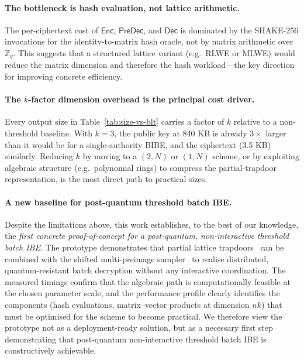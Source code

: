 \paragraph{The bottleneck is hash evaluation, not lattice arithmetic.}
The per-ciphertext cost of $\mathsf{Enc}$, $\mathsf{PreDec}$, and $\mathsf{Dec}$ is
dominated by the SHAKE-256 invocations for the identity-to-matrix hash oracle, not by
matrix arithmetic over $\mathbb{Z}_q$.
This suggests that a structured lattice variant (e.g.\ RLWE or MLWE) would reduce the
matrix dimension and therefore the hash workload—the key direction for improving concrete
efficiency.

\paragraph{The $k$-factor dimension overhead is the principal cost driver.}
Every output size in Table~\ref{tab:size-vs-blt} carries a factor of $k$ relative to a
non-threshold baseline.
With $k=3$, the public key at 840 KB is already $3\times$ larger than it would be for a
single-authority BIBE, and the ciphertext (3.5 KB) similarly.
Reducing $k$ by moving to a $(2,N)$ or $(1,N)$ scheme, or by exploiting algebraic
structure (e.g.\ polynomial rings) to compress the partial-trapdoor representation, is the
most direct path to practical sizes.

\paragraph{A new baseline for post-quantum threshold batch IBE.}
Despite the limitations above, this work establishes, to the best of our knowledge, the
\emph{first concrete proof-of-concept for a post-quantum, non-interactive threshold batch
IBE}.
The prototype demonstrates that partial lattice trapdoors~\cite{AC:ALLW25} can be combined
with the shifted multi-preimage sampler~\cite{EPRINT:BonLauTas25} to realise distributed,
quantum-resistant batch decryption without any interactive coordination.
The measured timings confirm that the algebraic path is computationally feasible at the
chosen parameter scale, and the performance profile clearly identifies the components
(hash evaluations, matrix--vector products at dimension $nk$) that must be optimised for
the scheme to become practical.
We therefore view the prototype not as a deployment-ready solution, but as a necessary
first step demonstrating that post-quantum non-interactive threshold batch IBE is
constructively achievable.
